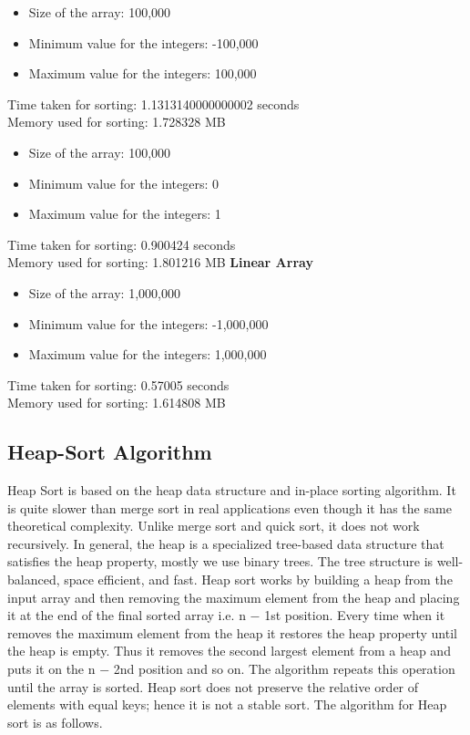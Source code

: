 \documentclass{article}
\begin{document}
\begin{itemize}
    \item Size of the array: 100,000
    \item Minimum value for the integers: -100,000
    \item Maximum value for the integers: 100,000
\end{itemize}

Time taken for sorting: 1.1313140000000002 seconds\\
Memory used for sorting: 1.728328 MB


\begin{itemize}
    \item Size of the array: 100,000
    \item Minimum value for the integers: 0
    \item Maximum value for the integers: 1
\end{itemize}

Time taken for sorting: 0.900424 seconds\\
Memory used for sorting: 1.801216 MB
\newpage
\textbf{Linear Array}

\begin{itemize}
    \item Size of the array: 1,000,000
    \item Minimum value for the integers: -1,000,000
    \item Maximum value for the integers: 1,000,000
\end{itemize}

Time taken for sorting: 0.57005 seconds\\
Memory used for sorting: 1.614808 MB



\subsection{Heap-Sort Algorithm}

Heap Sort is based on the heap data structure and in-place sorting algorithm.
It is quite slower than merge sort in real applications even though it has the same
theoretical complexity. Unlike merge sort and quick sort, it does not work recursively.
In general, the heap is a specialized tree-based data structure that satisfies the heap
property, mostly we use binary trees. The tree structure is well-balanced, space
efficient, and fast. Heap sort works by building a heap from the input array and
then removing the maximum element from the heap and placing it at the end of the
final sorted array i.e. n − 1st position. Every time when it removes the maximum
element from the heap it restores the heap property until the heap is empty. Thus it
removes the second largest element from a heap and puts it on the n − 2nd position
and so on. The algorithm repeats this operation until the array is sorted. Heap
sort does not preserve the relative order of elements with equal keys; hence it is not
a stable sort. The algorithm for Heap sort is as follows.\cite{karunanithi2014survey}
\end{document}
